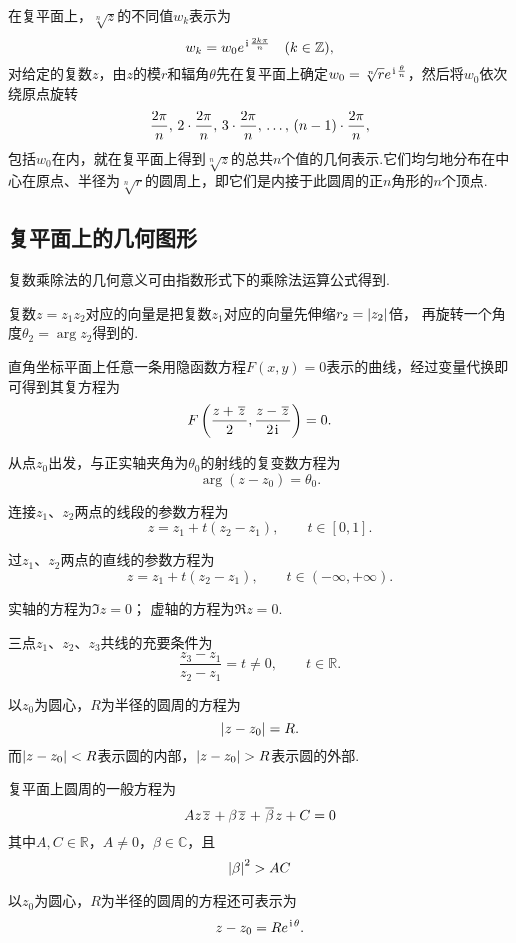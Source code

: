 在复平面上，\(\sqrt[n]{z}\)的不同值\(w_k\)表示为\[
w_k = w_0 e^{\kern1pt\mathrm{i}\kern1pt\frac{2k\pi}{n}} \quad (k \in \mathbb{Z}),
\]对给定的复数\(z\)，由\(z\)的模\(r\)和辐角\(\theta\)先在复平面上确定\(w_0 = \sqrt[n]{r} e^{\kern1pt\mathrm{i}\kern1pt\frac{\theta}{n}}\)，然后将\(w_0\)依次绕原点旋转\[
\def\f{\frac{2\pi}{n}}
\f,\,2\cdot\f,\,3\cdot\f,\,\dots,\,(n-1)\cdot\f,
\]包括\(w_0\)在内，就在复平面上得到\(\sqrt[n]{z}\)的总共\(n\)个值的几何表示.它们均匀地分布在中心在原点、半径为\(\sqrt[n]{r}\)的圆周上，即它们是内接于此圆周的正\(n\)角形的\(n\)个顶点.

\subsection{复平面上的几何图形}
复数乘除法的几何意义可由指数形式下的乘除法运算公式得到.

复数\(z=z_1 z_2\)对应的向量是把复数\(z_1\)对应的向量先伸缩\(r_2 = \abs{z_2}\)倍，%
再旋转一个角度\(\theta_2 = \arg z_2\)得到的.

直角坐标平面上任意一条用隐函数方程\(F(x,y)=0\)表示的曲线，经过变量代换即可得到其复方程为\[
F\left(\frac{z+\kern1pt\overline{z}\kern1pt}{2},\frac{z-\kern1pt\overline{z}\kern1pt}{2\kern1pt\mathrm{i}\kern1pt}\right)=0.
\]

\begin{example}[射线]
从点\(z_0\)出发，与正实轴夹角为\(\theta_0\)的射线的复变数方程为\[
\arg(z-z_0) = \theta_0.
\]
\end{example}

\begin{example}[线段]
连接\(z_1\)、\(z_2\)两点的线段的参数方程为\[
z = z_1 + t(z_2 - z_1), \qquad t \in [0,1].
\]
\end{example}

\begin{example}[直线]
过\(z_1\)、\(z_2\)两点的直线的参数方程为\[
z = z_1 + t(z_2 - z_1), \qquad t \in (-\infty,+\infty).
\]

实轴的方程为\(\Im z = 0\)；
虚轴的方程为\(\Re z = 0\).
\end{example}

\begin{example}[三点共线的充要条件]
三点\(z_1\)、\(z_2\)、\(z_3\)共线的充要条件为\[
\frac{z_3 - z_1}{z_2 - z_1} = t \neq 0, \qquad t \in \mathbb{R}.
\]
\end{example}

\begin{example}[圆]
以\(z_0\)为圆心，\(R\)为半径的圆周的方程为\[
\abs{z - z_0} = R.
\]而\(\abs{z-z_0}<R\)表示圆的内部，\(\abs{z-z_0}>R\)表示圆的外部.

复平面上圆周的一般方程为\[
A z \kern1pt\overline{z}\kern1pt + \beta \kern1pt\overline{z}\kern1pt + \kern1pt\overline{\beta}\kern1pt z + C = 0
\]其中\(A,C\in\mathbb{R}\)，\(A \neq 0\)，\(\beta\in\mathbb{C}\)，且\[
\abs{\beta}^2 > AC
\]

以\(z_0\)为圆心，\(R\)为半径的圆周的方程还可表示为\[
z - z_0 = R e^{\kern1pt\mathrm{i}\kern1pt \theta}.
\]
\end{example}

